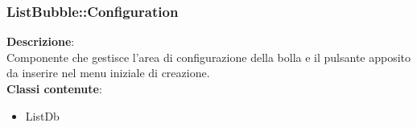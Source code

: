 \subsubsection{ListBubble::Configuration}
   \FloatBarrier
\FloatBarrier
\textbf{Descrizione}:\\
 Componente che gestisce l'area di configurazione della bolla e il pulsante apposito da inserire nel menu iniziale di creazione. 
\\ \textbf{Classi contenute}:\\
\begin{itemize}
\item ListDb
\end{itemize}


\clearpage

